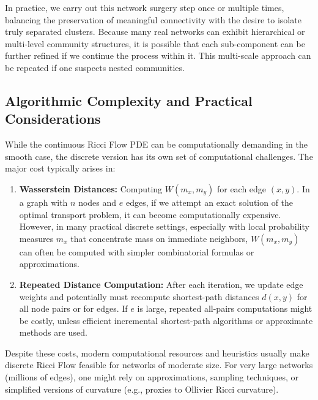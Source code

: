 In practice, we carry out this network surgery step once or multiple times, balancing the preservation of meaningful connectivity with the desire to isolate truly separated clusters. Because many real networks can exhibit hierarchical or multi-level community structures, it is possible that each sub-component can be further refined if we continue the process within it. This multi-scale approach can be repeated if one suspects nested communities.

\subsection{Algorithmic Complexity and Practical Considerations}
\label{subsec:complexity}

While the continuous Ricci Flow PDE can be computationally demanding in the smooth case, the discrete version has its own set of computational challenges. The major cost typically arises in:
\begin{enumerate}
    \item \textbf{Wasserstein Distances:} Computing $W(m_x, m_y)$ for each edge $(x,y)$. In a graph with $n$ nodes and $e$ edges, if we attempt an exact solution of the optimal transport problem, it can become computationally expensive. However, in many practical discrete settings, especially with local probability measures $m_x$ that concentrate mass on immediate neighbors, $W(m_x,m_y)$ can often be computed with simpler combinatorial formulas or approximations. 
    \item \textbf{Repeated Distance Computation:} After each iteration, we update edge weights and potentially must recompute shortest-path distances $d(x,y)$ for all node pairs or for edges. If $e$ is large, repeated all-pairs computations might be costly, unless efficient incremental shortest-path algorithms or approximate methods are used.
\end{enumerate}
Despite these costs, modern computational resources and heuristics usually make discrete Ricci Flow feasible for networks of moderate size. For very large networks (millions of edges), one might rely on approximations, sampling techniques, or simplified versions of curvature (e.g., proxies to Ollivier Ricci curvature).

